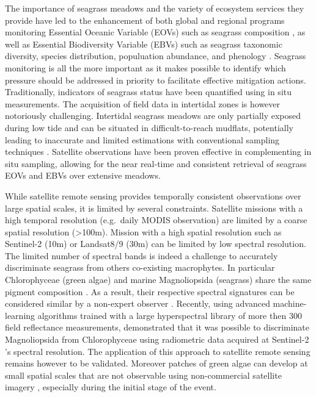 \documentclass[
  number]{elsarticle}
\begin{document}
The importance of seagrass meadows and the variety of ecosystem services
they provide have led to the enhancement of both global and regional
programs monitoring Essential Oceanic Variable (EOVs) such as seagrass
composition \citep{Miloslavich2018}, as well as Essential Biodiversity
Variable (EBVs) such as seagrass taxonomic diversity, species
distribution, populuation abundance, and phenology \citep{Pereira2013}.
Seagrass monitoring is all the more important as it makes possible to
identify which pressure should be addressed in priority to facilitate
effective mitigation actions. Traditionally, indicators of seagrass
status have been quantified using in situ measurements. The acquisition
of field data in intertidal zones is however notoriously challenging.
Intertidal seagrass meadows are only partially exposed during low tide
and can be situated in difficult-to-reach mudflats, potentially leading
to inaccurate and limited estimations with conventional sampling
techniques \citep{nijland2019}. Satellite observations have been proven
effective in complementing in situ sampling, allowing for the near
real-time and consistent retrieval of seagrass EOVs and EBVs over
extensive meadows. \citetext{\citealp[ ]{Zoffoli2021}; \citealp[
]{xu2021}; \citealp[ ]{Traganos2018}; \citealp{coffer2023}}

While satellite remote sensing provides temporally consistent
observations over large spatial scales, it is limited by several
constraints. Satellite missions with a high temporal resolution
(e.g.~daily MODIS observation) are limited by a coarse spatial
resolution (\textgreater100m). Mission with a high spatial resolution
such as Sentinel-2 (10m) or Landsat8/9 (30m) can be limited by low
spectral resolution. The limited number of spectral bands is indeed a
challenge to accurately discriminate seagrass from others co-existing
macrophytes. In particular Chlorophyceae (green algae) and marine
Magnoliopsida (seagrass) share the same pigment composition
\citetext{\citealp[ ]{ralph2002}; \citealp{Douay2022}}. As a result,
their respective spectral signatures can be considered similar by a
non-expert observer \citetext{\citealp[
]{Davies2023}; \citealp{bannari2022}}. Recently, using advanced
machine-learning algorithms trained with a large hyperspectral library
of more then 300 field reflectance measurements, \citep{Davies2023}
demonstrated that it was possible to discriminate Magnoliopsida from
Chlorophyceae using radiometric data acquired at Sentinel-2 's spectral
resolution. The application of this approach to satellite remote sensing
remains however to be validated. Moreover patches of green algae can
develop at small spatial scales that are not observable using
non-commercial satellite imagery \citep{tuya2013}, especially during the
initial stage of the event.
\end{document}
